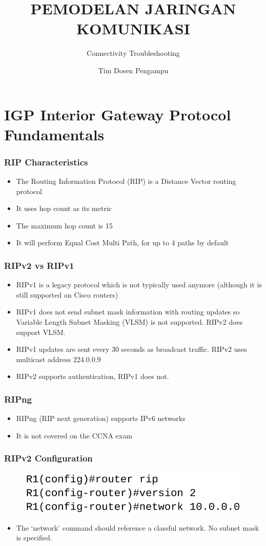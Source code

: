 \documentclass[pdflatex,compress,mathserif]{beamer}
\title{PEMODELAN JARINGAN KOMUNIKASI}
\subtitle{Connectivity Troubleshooting}
\author{Tim Dosen Pengampu}
\begin{document}
	
\maketitle

\section{IGP Interior Gateway Protocol Fundamentals}

\begin{frame}
	\frametitle{RIP Characteristics}
	\begin{itemize}
		\item The Routing Information Protocol (RIP) is a Distance Vector
routing protocol
		\item It uses hop count as its metric
		\item The maximum hop count is 15
		\item It will perform Equal Cost Multi Path, for up to 4 paths by default
	\end{itemize}
\end{frame}

\begin{frame}
	\frametitle{RIPv2 vs RIPv1}
	\begin{itemize}
		\item RIPv1 is a legacy protocol which is not typically used anymore
(although it is still supported on Cisco routers)
		\item RIPv1 does not send subnet mask information with routing
updates so Variable Length Subnet Masking (VLSM) is not
supported. RIPv2 does support VLSM.
		\item RIPv1 updates are sent every 30 seconds as broadcast traffic.
RIPv2 uses multicast address 224.0.0.9
		\item RIPv2 supports authentication, RIPv1 does not.
	\end{itemize}
\end{frame}

\begin{frame}
	\frametitle{RIPng}
	\begin{itemize}
		\item RIPng (RIP next generation) supports IPv6 networks
		\item It is not covered on the CCNA exam
	\end{itemize}
\end{frame}

\begin{frame}
	\frametitle{RIPv2 Configuration}
	\begin{figure}
		\centering
		\includegraphics[width=0.7\linewidth]{img/img01}
	\end{figure}
	\begin{itemize}
		\item The ‘network’ command should reference a classful network. No subnet
		mask is specified.
	\end{itemize}
\end{frame}
\end{document}
